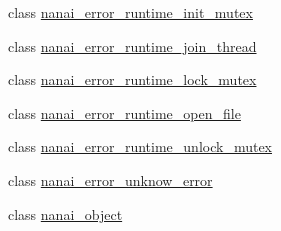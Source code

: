 \begin{DoxyCompactItemize}
\item 
class \hyperlink{classnanai_1_1nanai__error__runtime__init__mutex}{nanai\+\_\+error\+\_\+runtime\+\_\+init\+\_\+mutex}
\item 
class \hyperlink{classnanai_1_1nanai__error__runtime__join__thread}{nanai\+\_\+error\+\_\+runtime\+\_\+join\+\_\+thread}
\item 
class \hyperlink{classnanai_1_1nanai__error__runtime__lock__mutex}{nanai\+\_\+error\+\_\+runtime\+\_\+lock\+\_\+mutex}
\item 
class \hyperlink{classnanai_1_1nanai__error__runtime__open__file}{nanai\+\_\+error\+\_\+runtime\+\_\+open\+\_\+file}
\item 
class \hyperlink{classnanai_1_1nanai__error__runtime__unlock__mutex}{nanai\+\_\+error\+\_\+runtime\+\_\+unlock\+\_\+mutex}
\item 
class \hyperlink{classnanai_1_1nanai__error__unknow__error}{nanai\+\_\+error\+\_\+unknow\+\_\+error}
\item 
class \hyperlink{classnanai_1_1nanai__object}{nanai\+\_\+object}
\end{DoxyCompactItemize}
